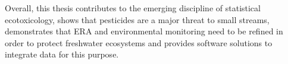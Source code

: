 Overall, this thesis contributes to the emerging discipline of statistical ecotoxicology, shows that pesticides are a major threat to small streams, demonstrates that ERA and environmental monitoring need to be refined in order to protect freshwater ecosystems and provides software solutions to integrate data for this purpose.



\endgroup 
 
